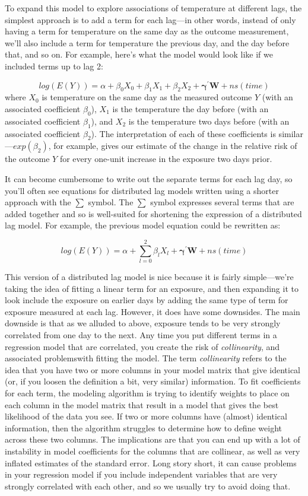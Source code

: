 \documentclass[
]{book}
\begin{document}
To expand this model to explore associations of temperature at different lags, the
simplest approach is to add a term for each lag---in other words, instead of only having
a term for temperature on the same day as the outcome measurement, we'll also include a
term for temperature the previous day, and the day before that, and so on. For example,
here's what the model would look like if we included terms up to lag 2:

\[
log(E(Y)) = \alpha + \beta_{0} X_{0} + \beta_{1} X_{1} + \beta_{2} X_{2} + \mathbf{\gamma^{'}W} + ns(time)
\]
where \(X_0\) is temperature on the same day as the measured outcome \(Y\) (with an
associated coefficient \(\beta_0\)), \(X_1\) is the temperature the day before (with an
associated coefficient \(\beta_1\)), and \(X_2\) is the temperature two days before (with an
associated coefficient \(\beta_2\)). The interpretation of each of these coefficients
is similar---\(exp(\beta_2)\), for example, gives our estimate of the change in the relative
risk of the outcome \(Y\) for every one-unit increase in the exposure two days prior.

It can become cumbersome to write out the separate terms for each lag day, so you'll often
see equations for distributed lag models written using a shorter approach with the
\(\sum\) symbol. The \(\sum\) symbol expresses several terms that are added together and so
is well-suited for shortening the expression of a distributed lag model. For example, the
previous model equation could be rewritten as:

\[
log(E(Y)) = \alpha + \sum_{l=0}^2{\beta_lX_l} + \mathbf{\gamma^{'}W} + ns(time)
\]

This version of a distributed lag model is nice because it is fairly simple---we're taking the
idea of fitting a linear term for an exposure, and then expanding it to look include the
exposure on earlier days by adding the same type of term for exposure measured at each lag.
However, it does have some downsides. The main downside is that as we alluded to above, exposure
tends to be very strongly correlated from one day to the next. Any time you put different terms in a regression model that are correlated, you create the risk of \emph{collinearity}, and associated
problemswith fitting the model. The term \emph{collinearity} refers to the idea that you have two or more
columns in your model matrix that give identical (or, if you loosen the definition a bit,
very similar) information. To fit coefficients for each term, the modeling algorithm is trying
to identify weights to place on each column in the model matrix that result in a model that
gives the best likelihood of the data you see. If two or more columns have (almost) identical
information, then the algorithm struggles to determine how to define weight across these
two columns. The implications are that you can end up with a lot of instability in model
coefficients for the columns that are collinear, as well as very inflated estimates of the
standard error. Long story short, it can cause problems in your regression model if you include
independent variables that are very strongly correlated with each other, and so we usually
try to avoid doing that.
\end{document}
